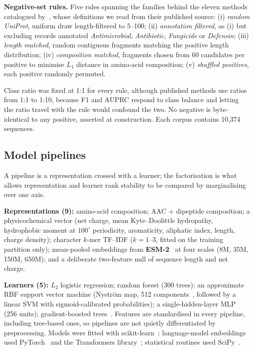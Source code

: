 \documentclass[11pt,a4paper]{article}
\begin{document}
\textbf{Negative-set rules.} Five rules spanning the families behind the eleven methods
catalogued by~\citet{sidorczuk2022negative}, whose definitions we read from their published
source: (i) \emph{random UniProt}, uniform draw length-filtered to 5--100; (ii)
\emph{annotation filtered}, as (i) but excluding records annotated \textit{Antimicrobial},
\textit{Antibiotic}, \textit{Fungicide} or \textit{Defensin}; (iii) \emph{length matched},
random contiguous fragments matching the positive length distribution; (iv)
\emph{composition matched}, fragments chosen from 60 candidates per positive to minimise
$L_1$ distance in amino-acid composition; (v) \emph{shuffled positives}, each positive
randomly permuted.

Class ratio was fixed at 1:1 for every rule, although published methods use ratios from 1:1
to 1:10, because F1 and AUPRC respond to class balance and letting the ratio travel with
the rule would confound the two. No negative is byte-identical to any positive, asserted at
construction. Each corpus contains 10{,}374 sequences.

\subsection{Model pipelines}

A pipeline is a representation crossed with a learner; the factorisation is what allows
representation and learner rank stability to be compared by marginalising over one axis.

\textbf{Representations (9):} amino-acid composition; AAC + dipeptide composition;
a physicochemical vector (net charge, mean Kyte--Doolittle hydropathy, hydrophobic moment
at $100^\circ$ periodicity, aromaticity, aliphatic index, length, charge density);
character $k$-mer TF--IDF ($k=1$--$3$, fitted on the training partition only); mean-pooled
embeddings from \textbf{ESM-2}~\citep{lin2023esm2} at four scales (8M, 35M, 150M, 650M);
and a deliberate two-feature null of sequence length and net charge.

\textbf{Learners (5):} $L_2$ logistic regression; random forest (300 trees); an approximate
RBF support vector machine (Nystr\"om map, 512 components~\citep{williams1998nystroem},
followed by a linear SVM with sigmoid-calibrated probabilities); a single-hidden-layer MLP
(256 units); gradient-boosted trees~\citep{chen2016xgboost}. Features are standardised in
every pipeline, including tree-based ones, so pipelines are not quietly differentiated by
preprocessing. Models were fitted with scikit-learn~\citep{pedregosa2011sklearn}; language-model
embeddings used PyTorch~\citep{paszke2019pytorch} and the Transformers
library~\citep{wolf2020transformers}; statistical routines used SciPy~\citep{virtanen2020scipy}.
\end{document}
